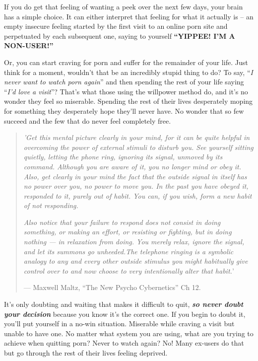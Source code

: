 \documentclass[
]{book}
\begin{document}
If you do get that feeling of wanting a peek over the next few days, your brain has a simple choice. It can either interpret that feeling for what it actually is -- an empty insecure feeling started by the first visit to an online porn site and perpetuated by each subsequent one, saying to yourself \textbf{``YIPPEE! I'M A NON-USER!''}

Or, you can start craving for porn and suffer for the remainder of your life. Just think for a moment, wouldn't that be an incredibly stupid thing to do? To say, ``\emph{I never want to watch porn again}'' and then spending the rest of your life saying ``\emph{I'd love a visit}''? That's what those using the willpower method do, and it's no wonder they feel so miserable. Spending the rest of their lives desperately moping for something they desperately hope they'll never have. No wonder that so few succeed and the few that do never feel completely free.

\begin{quote}
\emph{'Get this mental picture clearly in your mind, for it can be quite helpful in overcoming the power of external stimuli to disturb you. See yourself sitting quietly, letting the phone ring, ignoring its signal, unmoved by its command. Although you are aware of it, you no longer mind or obey it. Also, get clearly in your mind the fact that the outside signal in itself has no power over you, no power to move you. In the past you have obeyed it, responded to it, purely out of habit. You can, if you wish, form a new habit of not responding.}

\emph{Also notice that your failure to respond does not consist in doing something, or making an effort, or resisting or fighting, but in doing nothing --- in relaxation from doing. You merely relax, ignore the signal, and let its summons go unheeded.The telephone ringing is a symbolic analogy to any and every other outside stimulus you might habitually give control over to and now choose to very intentionally alter that habit.}'

--- Maxwell Maltz, ``The New Psycho Cybernetics'' Ch 12.
\end{quote}

It's only doubting and waiting that makes it difficult to quit, \textbf{\emph{so never doubt your decision}} because you know it's the correct one. If you begin to doubt it, you'll put yourself in a no-win situation. Miserable while craving a visit but unable to have one. No matter what system you are using, what are you trying to achieve when quitting porn? Never to watch again? No! Many ex-users do that but go through the rest of their lives feeling deprived.
\end{document}
